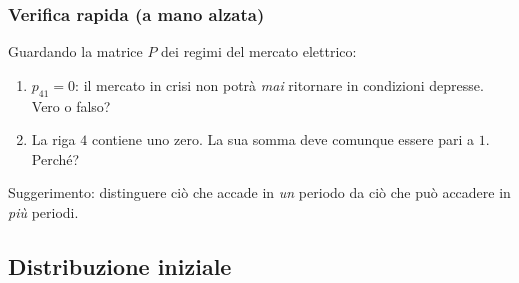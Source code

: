 \documentclass[handout]{beamer}%
\newenvironment{stepenumerate}{\begin{enumerate}[<+->]}{\end{enumerate}}
\providecommand{\QTR}[2]{\csname #1\endcsname{#2}}
\begin{document}
\begin{frame}%
%

\frametitle{Verifica rapida (a mano alzata)}%
%

%


Guardando la matrice $P$ dei regimi del mercato elettrico:

\bigskip

\begin{stepenumerate}
\item[1.] $p_{41}=0$: il mercato in crisi non potr\`{a} \emph{mai} ritornare
in condizioni depresse. Vero o falso?

\item[2.] La riga $4$ contiene uno zero. La sua somma deve comunque essere
pari a $1$. Perch\'{e}?
\end{stepenumerate}

\bigskip

\begin{center}
{\small Suggerimento: distinguere ci\`{o} che accade in \emph{un} periodo da
ci\`{o} che pu\`{o} accadere in \emph{pi\`{u}} periodi.}
\end{center}%

\transboxout
\end{frame}%




\subsection{Distribuzione iniziale}%
\end{document}

